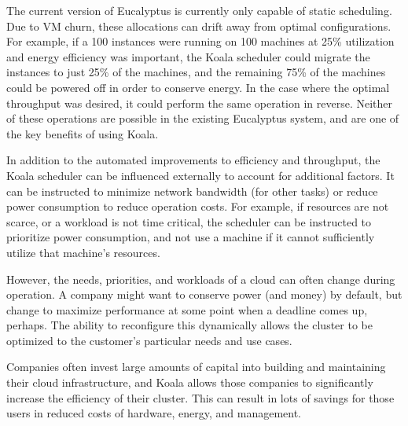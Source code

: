 \begin{Introduction}
  The current version of Eucalyptus is currently only capable of static scheduling.  Due to VM churn, these allocations can drift away from optimal configurations.  For example, if a 100 instances were running on 100 machines at 25\% utilization and energy efficiency was important, the Koala scheduler could migrate the instances to just 25\% of the machines, and the remaining 75\% of the machines could be powered off in order to conserve energy.  In the case where the optimal throughput was desired, it could perform the same operation in reverse.  Neither of these operations are possible in the existing Eucalyptus system, and are one of the key benefits of using Koala.

  In addition to the automated improvements to efficiency and throughput, the Koala scheduler can be influenced externally to account for additional factors.  It can be instructed to minimize network bandwidth (for other tasks) or reduce power consumption to reduce operation costs.  For example, if resources are not scarce, or a workload is not time critical, the scheduler can be instructed to prioritize power consumption, and not use a machine if it cannot sufficiently utilize that machine's resources.

  However, the needs, priorities, and workloads of a cloud can often change during operation.  A company might want to conserve power (and money) by default, but change to maximize performance at some point when a deadline comes up, perhaps.  The ability to reconfigure this dynamically allows the cluster to be optimized to the customer's particular needs and use cases.

  Companies often invest large amounts of capital into building and maintaining their cloud infrastructure, and Koala allows those companies to significantly increase the efficiency of their cluster.  This can result in lots of savings for those users in reduced costs of hardware, energy, and management.
\end{Introduction}
  

  
